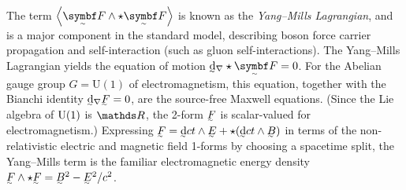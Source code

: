 The term $\angbr{\tsbm F \wedge\star \tsbm F}$ is known as the \emph{Yang--Mills Lagrangian}, and is a major component in the standard model, describing boson force carrier propagation and self-interaction (such as gluon self-interactions).
The Yang--Mills Lagrangian yields the equation of motion $\covdd\star\tsbm F = 0$.
For the Abelian gauge group $G = \mathrm{U}(1)$ of electromagnetism, this equation, together with the Bianchi identity $\covdd\ts F = 0$, are the source-free Maxwell equations.
(Since the Lie algebra of $\mathrm{U}(1)$ is $\RR$, the 2-form $\ts F$ is scalar-valued for electromagnetism.)
Expressing
\begin{math}
	\ts F = \ts\dd ct\wedge\ts E + \star(\ts\dd ct\wedge \ts B)
\end{math}
in terms of the non-relativistic electric and magnetic field 1-forms by choosing a spacetime split, the Yang--Mills term is the familiar electromagnetic energy density $\ts F \wedge\star \ts F = \ts B^2 - \ts E^2/c^2$.


